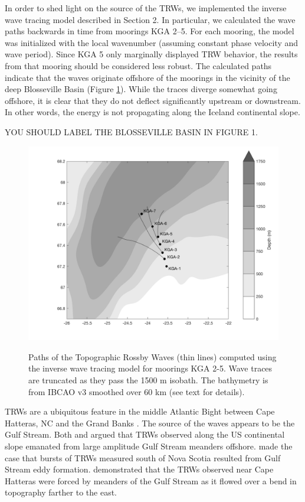 \documentclass[12pt,titlepage,figuresatend]{article}
\begin{document}
In order to shed light on the source of the TRWs, we implemented the inverse wave tracing model described in Section 2. In particular, we calculated the wave paths backwards in time from moorings KGA 2--5. For each mooring, the model was initialized with the local wavenumber (assuming constant phase velocity and wave period). Since KGA 5 only marginally displayed TRW behavior, the results from that mooring should be considered less robust. The calculated paths indicate that the waves originate offshore of the moorings in the vicinity of the deep Blosseville Basin (Figure \ref{fig_waveTrace}). While the traces diverge somewhat going offshore, it is clear that they do not deflect significantly upstream or downstream. In other words, the energy is not propagating along the Iceland continental slope.

YOU SHOULD LABEL THE BLOSSEVILLE BASIN IN FIGURE 1.

\begin{figure}[p!]
  \centering\includegraphics[width=\hsize]{./figures/wave_trace.pdf}
  \caption{Paths of the Topographic Rossby Waves (thin lines) computed using the inverse wave tracing model for moorings KGA 2-5. Wave traces are truncated as they pass the 1500 m isobath. The bathymetry is from IBCAO v3 smoothed over 60 km (see text for details).}{\label{fig_waveTrace}}
\end{figure}

TRWs are a ubiquitous feature in the middle Atlantic Bight between Cape Hatteras, NC and the Grand Banks \cite[]{Louis1982,Johns1986,Pickart1990}. The source of the waves appears to be the Gulf Stream. Both \cite{Hogg1981} and \cite{Schultz1987} argued that TRWs observed along the US continental slope emanated from large amplitude Gulf Stream meanders offshore. \cite{Louis1982} made the case that bursts of TRWs measured south of Nova Scotia resulted from Gulf Stream eddy formation. \cite{Pickart1995} demonstrated that the TRWs observed near Cape Hatteras were forced by meanders of the Gulf Stream as it flowed over a bend in topography farther to the east. 
\end{document}
